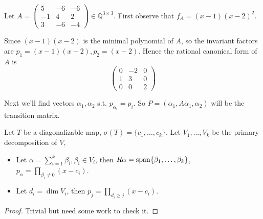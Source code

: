 \begin{example}
    Let $A = \begin{pmatrix}
		5 &-6 &-6\\ -1 &4 &2 \\ 3 &-6 &-4
    \end{pmatrix}\in \mathbb{Q}^{3\times 3}$.
	First observe that $f_A = (x-1)(x-2)^2$.

	Since $(x-1)(x-2)$ is the minimal polynomial of $A$,
	so the invariant factors are $p_1 = (x-1)(x-2), p_2 = (x-2)$.
	Hence the rational canonical form of $A$ is
	\[
	\begin{pmatrix}
		0 &-2 &0\\ 1 &3 &0\\ 0 &0 &2
	\end{pmatrix}
	\]

	Next we'll find vectors $\alpha_1,\alpha_2$ s.t. $p_{\alpha_i} = p_i$.
	So $P = (\alpha_1, A\alpha_1, \alpha_2)$ will be the transition matrix.
\end{example}

\begin{proposition}
	Let $T$ be a diagonalizable map, $\sigma(T)=\{c_1,\dots,c_k\}$.
	Let $V_1,\dots,V_k$ be the primary decomposition of $V$,
	\begin{itemize}
		\item Let $\alpha = \sum_{i=1}^{k} \beta_i, \beta_i\in V_i$,
			then $R\alpha = \operatorname{span}\{\beta_1,\dots,\beta_k\}$,
			$p_\alpha = \prod_{\beta_i\ne 0}(x-c_i) $.
		\item Let $d_i=\dim V_i$, then $p_j = \prod_{d_i\ge j}(x-c_i)$.
	\end{itemize}
\end{proposition}
\begin{proof}[Proof]
    Trivial but need some work to check it.
\end{proof}
